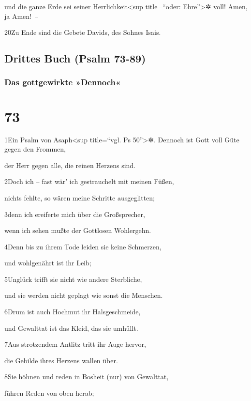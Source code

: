 und die ganze Erde sei seiner Herrlichkeit\textless sup title=``oder:
Ehre''\textgreater✲ voll! Amen, ja Amen!~--

20Zu Ende sind die Gebete Davids, des Sohnes Isais.

\hypertarget{drittes-buch-psalm-73-89}{%
\subsection{Drittes Buch (Psalm 73-89)}\label{drittes-buch-psalm-73-89}}

\hypertarget{das-gottgewirkte-dennoch}{%
\subsubsection{Das gottgewirkte
»Dennoch«}\label{das-gottgewirkte-dennoch}}

\hypertarget{section-72}{%
\section{73}\label{section-72}}

1Ein Psalm von Asaph\textless sup title=``vgl. Ps 50''\textgreater✲.
Dennoch ist Gott voll Güte gegen den Frommen,

der Herr gegen alle, die reinen Herzens sind.

2Doch ich -- fast wär' ich gestrauchelt mit meinen Füßen,

nichts fehlte, so wären meine Schritte ausgeglitten;

3denn ich ereiferte mich über die Großsprecher,

wenn ich sehen mußte der Gottlosen Wohlergehn.

4Denn bis zu ihrem Tode leiden sie keine Schmerzen,

und wohlgenährt ist ihr Leib;

5Unglück trifft sie nicht wie andere Sterbliche,

und sie werden nicht geplagt wie sonst die Menschen.

6Drum ist auch Hochmut ihr Halsgeschmeide,

und Gewalttat ist das Kleid, das sie umhüllt.

7Aus strotzendem Antlitz tritt ihr Auge hervor,

die Gebilde ihres Herzens wallen über.

8Sie höhnen und reden in Bosheit (nur) von Gewalttat,

führen Reden von oben herab;


